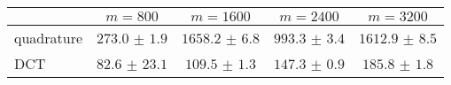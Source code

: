 \centering
\renewcommand{\arraystretch}{1.2}
\begin{tabular}{@{}lcccc@{}}
\toprule
 & $m=800$ & $m=1600$ & $m=2400$ & $m=3200$\\
\midrule
quadrature & $273.0$ $\pm$ $1.9$ & $1658.2$ $\pm$ $6.8$ & $993.3$ $\pm$ $3.4$ & $1612.9$ $\pm$ $8.5$ \\
DCT & $82.6$ $\pm$ $23.1$ & $109.5$ $\pm$ $1.3$ & $147.3$ $\pm$ $0.9$ & $185.8$ $\pm$ $1.8$ \\
\bottomrule
\end{tabular}
